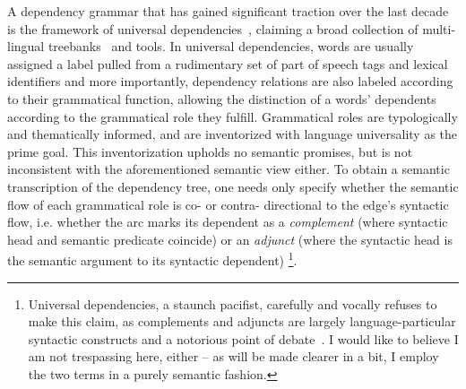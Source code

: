 A dependency grammar that has gained significant traction over the last decade is the framework of universal dependencies~\cite{10.1162/coli_a_00402}, claiming a broad collection of multi-lingual treebanks~\cite{nivre2020universal} and tools.
In universal dependencies, words are usually assigned a label pulled from a rudimentary set of part of speech tags and lexical identifiers and more importantly, dependency relations are also labeled according to their grammatical function, allowing the distinction of a words' dependents according to the grammatical role they fulfill.
Grammatical roles are typologically and thematically informed, and are inventorized with language universality as the prime goal.
This inventorization upholds no semantic promises, but is not inconsistent with the aforementioned semantic view either.
To obtain a semantic transcription of the dependency tree, one needs only specify whether the semantic flow of each grammatical role is co- or contra- directional to the edge's syntactic flow, i.e. whether the arc marks its dependent as a \textit{complement} (where syntactic head and semantic predicate coincide) or an \textit{adjunct} (where the syntactic head is the semantic argument to its syntactic dependent)%
	\footnote{Universal dependencies, a staunch pacifist, carefully and vocally refuses to make this claim, as complements and adjuncts are largely language-particular syntactic constructs and a notorious point of debate~\cite{haspelmath2014arguments}.
	I would like to believe I am not trespassing here, either -- as will be made clearer in a bit, I employ the two terms in a purely semantic fashion.}.

